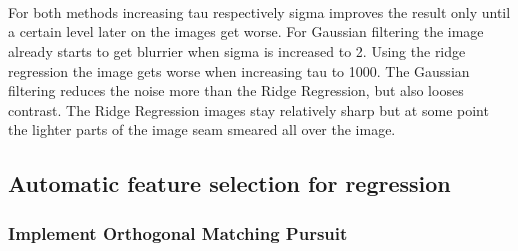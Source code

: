 \documentclass[11pt]{article}
\begin{document}
    \begin{center}
    \end{center}
    { \hspace*{\fill} \\}
    
    \begin{center}
    \end{center}
    { \hspace*{\fill} \\}
    
    \begin{center}
    \end{center}
    { \hspace*{\fill} \\}
    
    For both methods increasing tau respectively sigma improves the result
only until a certain level later on the images get worse. For Gaussian
filtering the image already starts to get blurrier when sigma is
increased to 2. Using the ridge regression the image gets worse when
increasing tau to 1000. The Gaussian filtering reduces the noise more
than the Ridge Regression, but also looses contrast. The Ridge
Regression images stay relatively sharp but at some point the lighter
parts of the image seam smeared all over the image.

    \subsection{Automatic feature selection for
regression}\label{automatic-feature-selection-for-regression}

\subsubsection{Implement Orthogonal Matching
Pursuit}\label{implement-orthogonal-matching-pursuit}
\end{document}
